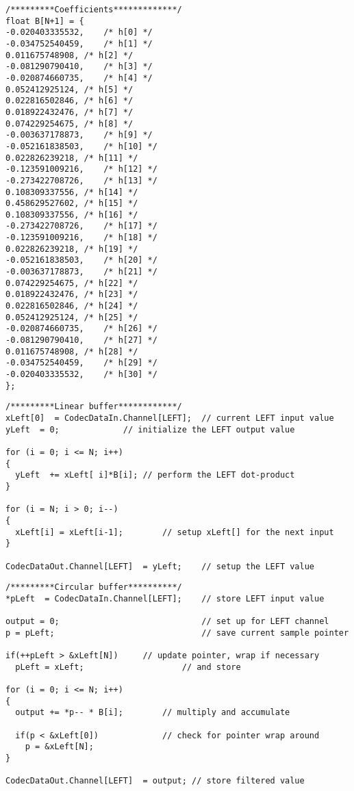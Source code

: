\documentclass{article}
\begin{document}
\begin{verbatim}
/*********Coefficients*************/
float B[N+1] = {
-0.020403335532,	/* h[0] */
-0.034752540459,	/* h[1] */
0.011675748908,	/* h[2] */
-0.081290790410,	/* h[3] */
-0.020874660735,	/* h[4] */
0.052412925124,	/* h[5] */
0.022816502846,	/* h[6] */
0.018922432476,	/* h[7] */
0.074229254675,	/* h[8] */
-0.003637178873,	/* h[9] */
-0.052161838503,	/* h[10] */
0.022826239218,	/* h[11] */
-0.123591009216,	/* h[12] */
-0.273422708726,	/* h[13] */
0.108309337556,	/* h[14] */
0.458629527602,	/* h[15] */
0.108309337556,	/* h[16] */
-0.273422708726,	/* h[17] */
-0.123591009216,	/* h[18] */
0.022826239218,	/* h[19] */
-0.052161838503,	/* h[20] */
-0.003637178873,	/* h[21] */
0.074229254675,	/* h[22] */
0.018922432476,	/* h[23] */
0.022816502846,	/* h[24] */
0.052412925124,	/* h[25] */
-0.020874660735,	/* h[26] */
-0.081290790410,	/* h[27] */
0.011675748908,	/* h[28] */
-0.034752540459,	/* h[29] */
-0.020403335532,	/* h[30] */
};
\end{verbatim}

\begin{verbatim}
/*********Linear buffer************/
xLeft[0]  = CodecDataIn.Channel[LEFT];	// current LEFT input value
yLeft  = 0;				// initialize the LEFT output value

for (i = 0; i <= N; i++)
{
  yLeft  += xLeft[ i]*B[i];	// perform the LEFT dot-product
}

for (i = N; i > 0; i--)
{
  xLeft[i] = xLeft[i-1];        // setup xLeft[] for the next input
}

CodecDataOut.Channel[LEFT]  = yLeft;	// setup the LEFT value	
\end{verbatim}

\begin{verbatim}
/*********Circular buffer**********/
*pLeft  = CodecDataIn.Channel[LEFT];	// store LEFT input value

output = 0;								// set up for LEFT channel
p = pLeft;								// save current sample pointer

if(++pLeft > &xLeft[N])		// update pointer, wrap if necessary
  pLeft = xLeft;					// and store

for (i = 0; i <= N; i++)
{
  output += *p-- * B[i];  		// multiply and accumulate

  if(p < &xLeft[0])       		// check for pointer wrap around
    p = &xLeft[N];
}

CodecDataOut.Channel[LEFT]  = output; // store filtered value
\end{verbatim}
\end{document}
